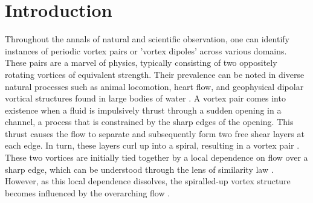\documentclass[final,3p,times,authoryear]{elsarticle}
\begin{document}
\begin{frontmatter}
%			
%			
%			


	\end{frontmatter}


	\section{Introduction}
	\label{sec:Introduction}
	
	
	
	Throughout the annals of natural and scientific observation, one can identify instances of periodic vortex pairs or 'vortex dipoles' across various domains. These pairs are a marvel of physics, typically consisting of two oppositely rotating vortices of equivalent strength. Their prevalence can be noted in diverse natural processes such as animal locomotion, heart flow, and geophysical dipolar vortical structures found in large bodies of water \citep{Costello2002, gharib2005,mohseni_2015, salsac_2006, Kheradvar2010, gopalakrishnan_2014, Ahlnas1987, Borve_2021}. A vortex pair comes into existence when a fluid is impulsively thrust through a sudden opening in a channel, a process that is constrained by the sharp edges of the opening. This thrust causes the flow to separate and subsequently form two free shear layers at each edge. In turn, these layers curl up into a spiral, resulting in a vortex pair \citep{Blondeaux1983}. These two vortices are initially tied together by a local dependence on flow over a sharp edge, which can be understood through the lens of similarity law \cite{Rott1956, Pullin1978}. However, as this local dependence dissolves, the spiralled-up vortex structure becomes influenced by the overarching flow \citep{Pullin1978, pullin_perry_1980}.
	
\end{document}

